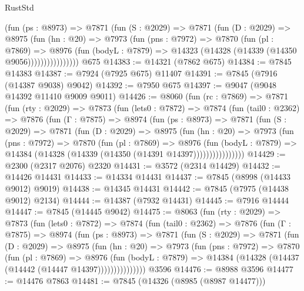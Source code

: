 \begin{lexlean}{RustStd}
\begin{coremodule}
                (fun (ps : @8973) =>
                @7871
                  (fun (S : @2029) =>
                  @7871
                    (fun (D : @2029) =>
                    @8975
                      (fun (hn : @20) =>
                      @7973
                        (fun (pns : @7972) =>
                        @7870
                          (fun (pl : @7869) =>
                          @8976
                            (fun (bodyL : @7879) =>
                            @14323 (@14328 (@14339 (@14350 @9056))))))))))))))))
    @675
@14383 := @14321 (@7862 @675)
@14384 := @7845 @14383
@14387 := @7924 (@7925 @675) @11407
@14391 := @7845 (@7916 (@14387 @9038) @9042)
@14392 := @7950 @675
@14397 := @9047 (@9048 @14392 @11410 @9009 @9011)
@14426 := @8060
    (fun (rc : @7869) =>
    @7871
      (fun (rty : @2029) =>
      @7873
        (fun (lets0 : @7872) =>
        @7874
          (fun (tail0 : @2362) =>
          @7876
            (fun (Γ : @7875) =>
            @8974
              (fun (ps : @8973) =>
              @7871
                (fun (S : @2029) =>
                @7871
                  (fun (D : @2029) =>
                  @8975
                    (fun (hn : @20) =>
                    @7973
                      (fun (pns : @7972) =>
                      @7870
                        (fun (pl : @7869) =>
                        @8976
                          (fun (bodyL : @7879) =>
                          @14384 (@14328 (@14339 (@14350 (@14391 @14397))))))))))))))))
@14429 := @2300 (@2317 @2076) @2320
@14431 := @3572 (@2314 @14429)
@14432 := @14426 @14431
@14433 := @14334 @14431
@14437 := @7845 (@8998 (@14433 @9012) @9019)
@14438 := @14345 @14431
@14442 := @7845 (@7975 (@14438 @9012) @2134)
@14444 := @14387 (@7932 @14431)
@14445 := @7916 @14444
@14447 := @7845 (@14445 @9042)
@14475 := @8063
    (fun (rty : @2029) =>
    @7873
      (fun (lets0 : @7872) =>
      @7874
        (fun (tail0 : @2362) =>
        @7876
          (fun (Γ : @7875) =>
          @8974
            (fun (ps : @8973) =>
            @7871
              (fun (S : @2029) =>
              @7871
                (fun (D : @2029) =>
                @8975
                  (fun (hn : @20) =>
                  @7973
                    (fun (pns : @7972) =>
                    @7870
                      (fun (pl : @7869) =>
                      @8976
                        (fun (bodyL : @7879) =>
                        @14384 (@14328 (@14437 (@14442 (@14447 @14397)))))))))))))))
    @3596
@14476 := @8988 @3596
@14477 := @14476 @7863
@14481 := @7845 (@14326 (@8985 (@8987 @14477)))

\end{coremodule}
\end{lexlean}
